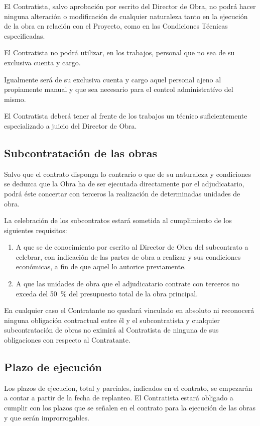 El Contratista, salvo aprobación por escrito del Director de Obra, no podrá hacer ninguna alteración o modificación de cualquier naturaleza tanto en la ejecución de la obra en relación con el Proyecto, como en las Condiciones Técnicas especificadas.

El Contratista no podrá utilizar, en los trabajos, personal que no sea de su exclusiva cuenta y cargo.

Igualmente será de su exclusiva cuenta y cargo aquel personal ajeno al propiamente manual y que sea necesario para el control administratívo del mismo.

El Contratista deberá tener al frente de los trabajos un técnico suficientemente especializado a juicio del Director de Obra.
\subsection{Subcontratación de las obras}
\label{subsec:pliego-subcontrataOrg}
Salvo que el contrato disponga lo contrario o que de su naturaleza y condiciones se deduzca que la Obra ha de ser ejecutada directamente por el adjudicatario, podrá éste concertar con terceros la realización de determinadas unidades de obra.  

La celebración de los subcontratos estará sometida al cumplimiento de los siguientes requisitos:
\begin{enumerate}[label=\alph*)]
  \item A que se de conocimiento por escrito al Director de Obra del subcontrato a celebrar, con indicación de las partes de obra a realizar y sus condiciones económicas, a fin de que aquel lo autorice previamente.  
  \item A que las unidades de obra que el adjudicatario contrate con terceros no exceda del \SI{50}{\percent} del presupuesto total de la obra principal.
\end{enumerate}
En cualquier caso el Contratante no quedará vinculado en absoluto ni reconocerá ninguna obligación contractual entre él y el subcontratista y cualquier subcontratación de obras no eximirá al Contratista de ninguna de sus obligaciones con respecto al Contratante.  
\subsection{Plazo de ejecución}
\label{subsec:pliego-plazoejecucionOrg}
Los plazos de ejecucion, total y parciales, indicados en el contrato, se empezarán a contar a partir de la fecha de replanteo.  
El Contratista estará obligado a cumplir con los plazos que se señalen en el contrato para la ejecución de las obras y que serán improrrogables.   

